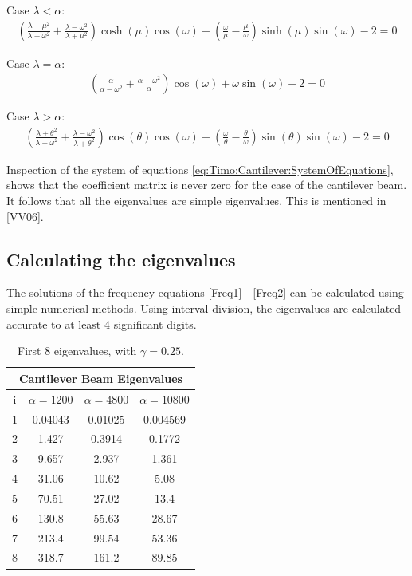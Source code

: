\documentclass[../../main.tex]{subfiles}
\begin{document}
Case $\lambda < \alpha$:\\
\begin{align}
	\left(\frac{\lambda + \mu^2}{\lambda - \omega^2} + \frac{\lambda - \omega^2}{\lambda + \mu^2} \right) \cosh (\mu) \cos (\omega) + \left(\frac{\omega}{\mu} - \frac{\mu}{\omega}\right) \sinh (\mu) \sin (\omega) - 2 = 0 \label{Freq1}
\end{align}

Case $\lambda = \alpha$:\\
\begin{align}
	\left(\frac{\alpha}{\alpha - \omega^2} + \frac{\alpha - \omega^2}{\alpha} \right) \cos (\omega) + \omega \sin (\omega) - 2 = 0 \label{Freq2}
\end{align}

Case $\lambda > \alpha$:\\
\begin{align}
	\left(\frac{\lambda + \theta^2}{\lambda - \omega^2} + \frac{\lambda - \omega^2}{\lambda + \theta^2} \right) \cos (\theta) \cos (\omega) + \left(\frac{\omega}{\theta} - \frac{\theta}{\omega}\right) \sin (\theta) \sin (\omega) - 2 = 0 \label{Freq3}
\end{align}

Inspection of the system of equations \eqref{eq:Timo:Cantilever:SystemOfEquations}, shows that the coefficient matrix is never zero for the case of the cantilever beam. It follows that all the eigenvalues are simple eigenvalues. This is mentioned in [VV06].

\subsection{Calculating the eigenvalues}
The solutions of the frequency equations \eqref{Freq1} - \eqref{Freq2} can be calculated using simple numerical methods. Using interval division, the eigenvalues are calculated accurate to at least 4 significant digits.
\FloatBarrier
\begin{table}[htbp]
	\centering
	\caption{First 8 eigenvalues, with $\gamma = 0.25$.}
	\begin{tabular}{|c||c|c|c|}
		\hline
		\multicolumn{4}{|c|}{Cantilever Beam Eigenvalues}\\
		\hline
		{i} & {$\alpha = 1200$} & {$\alpha = 4800$} & {$\alpha = 10800$} \\
		\hline
		1     & 0.04043 & 0.01025 & 0.004569 \\
		2     & 1.427 & 0.3914 & 0.1772 \\
		3     & 9.657 & 2.937 & 1.361 \\
		4     & 31.06 & 10.62 & 5.08 \\
		5     & 70.51 & 27.02 & 13.4 \\
		6     & 130.8 & 55.63 & 28.67 \\
		7     & 213.4 & 99.54 & 53.36 \\
		8     & 318.7 & 161.2 & 89.85 \\
		\hline
	\end{tabular}%
	\label{tab:addlabel}%
\end{table}%
\FloatBarrier
\end{document}
